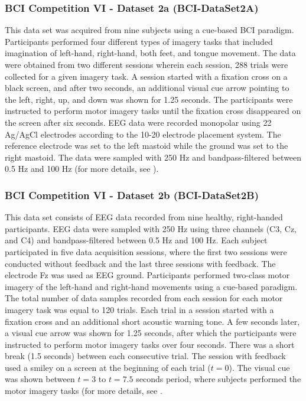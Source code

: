 \documentclass{ieeeaccess}
\begin{document}
    \subsubsection{BCI Competition VI - Dataset 2a (BCI-DataSet2A)}
    This data set was acquired from nine subjects using a cue-based BCI paradigm. Participants performed four different types of imagery tasks that included imagination of left-hand, right-hand, both feet, and tongue movement.  The data were obtained from two different sessions wherein each session, 288 trials were collected for a given imagery task.  A session started with a fixation cross on a black screen, and after two seconds, an additional visual cue arrow pointing to the left, right, up, and down was shown for 1.25 seconds. The participants were instructed to perform motor imagery tasks until the fixation cross disappeared on the screen after six seconds. EEG data were recorded monopolar using 22 Ag/AgCl electrodes according to the 10-20 electrode placement system. The reference electrode was set to the left mastoid while the ground was set to the right mastoid. The data were sampled with 250 Hz and bandpass-filtered between 0.5 Hz and 100 Hz (for more details, see \cite{tangermann2012review}).  
    
\subsubsection{BCI Competition VI - Dataset 2b (BCI-DataSet2B)}
 This data set consists of EEG data recorded from nine healthy, right-handed participants. EEG data were sampled with 250 Hz using three channels (C3, Cz, and C4) and bandpass-filtered between 0.5 Hz and 100 Hz. Each subject participated in five data acquisition sessions, where the first two sessions were conducted without feedback and the last three sessions with feedback. The electrode Fz was used as EEG ground. Participants performed two-class motor imagery of the left-hand and right-hand movements using a cue-based paradigm. The total number of data samples recorded from each session for each motor imagery task was equal to 120 trials. Each trial in a session started with a fixation cross and an additional short acoustic warning tone. A few seconds later, a visual cue arrow was shown for 1.25 seconds, after which the participants were instructed to perform motor imagery tasks over four seconds.  There was a short break (1.5 seconds) between each consecutive trial. The session with feedback used a smiley on a screen at the beginning of each trial ($t=0$). The visual cue was shown between $t=3$ to $t=7.5$ seconds period, where subjects performed the motor imagery tasks (for more details, see \cite{leeb2007brain}. 
        
\end{document}
